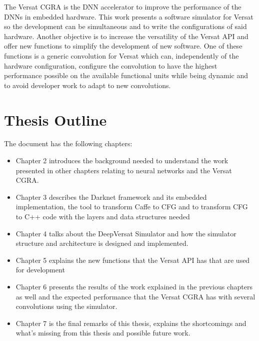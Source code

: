 The Versat CGRA is the DNN accelerator to improve the performance of the DNNs in embedded hardware.
This work presents a software simulator for Versat so the development can be simultaneous and
to write the configurations of said hardware.
Another objective is to increase the versatility of the Versat API and offer new functions
to simplify the development of new software. One of these functions is a generic convolution for
Versat which can, independently of the hardware configuration, configure the convolution to have
the highest performance possible on the available functional units while being dynamic and
to avoid developer work to adapt to new convolutions.






\section{Thesis Outline}
\label{reportoutline}

The document has the following chapters:

\begin{itemize}
	\item Chapter 2 introduces the background needed to understand the work presented in other 
chapters relating to neural networks and the Versat CGRA.
	\item Chapter 3 describes the Darknet framework and its embedded implementation, the tool
to transform Caffe to CFG and to transform CFG to C++ code with the layers and data structures needed
	\item Chapter 4 talks about the DeepVersat Simulator and how the simulator structure 
and architecture is designed and implemented.
	\item Chapter 5 explains the new functions that the Versat API has that are used for
development
	\item Chapter 6 presents the results of the work explained in the previous chapters as well
and the expected performance that the Versat CGRA has with several convolutions using the
simulator.
	\item Chapter 7 is the final remarks of this thesis, explains the shortcomings and what's missing
from this thesis and possible future work.
  \end{itemize}


